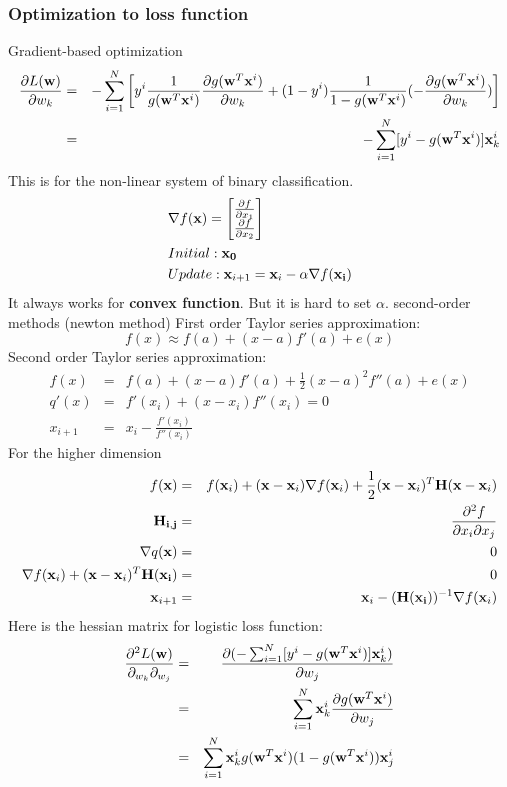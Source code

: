 \documentclass[12pt,a4paper]{article}
\begin{document}
\subsubsection*{Optimization to loss function}
{\large Gradient-based optimization}\\
\begin{eqnarray*}
\frac{\partial L({\bf w})}{\partial w_k} &=& -\sum_{i=1}^{N} \left[y^i\frac{1}{g({\bf w}^T{\bf x}^i)}\frac{\partial g({\bf w}^T{\bf x}^i)}{\partial w_k}+(1-y^i)\frac{1}{1-g({\bf w}^T{\bf x}^i)}(-\frac{\partial g({\bf w}^T{\bf x}^i)}{\partial w_k})\right]\\
&=& -\sum_{i=1}^{N}[y^i-g({\bf w}^T{\bf x}^i)]{\bf x}^i_k 
\end{eqnarray*}
This is for the non-linear system of binary classification.\\
\begin{eqnarray*}
&\nabla f({\bf x}) = \left[\begin{matrix}
\frac{\partial f}{\partial x_1}\\
\frac{\partial f}{\partial x_2}
\end{matrix}\right] \\
&Initial: \bf x_0 \\
&Update: {\bf x}_{i+1} = {\bf x}_i-\alpha\nabla f({\bf x_i}) \\
\end{eqnarray*}
It always works for \textbf{convex function}. But it is hard to set $\alpha$.
\large{second-order methods (newton method)}
First order Taylor series approximation:
$$
f(x) \approx f(a)+(x-a)f'(a)+e(x)
$$
Second order Taylor series approximation:
\begin{eqnarray*}
f(x) &=& f(a)+(x-a)f'(a)+\frac{1}{2}(x-a)^2f''(a)+e(x)\\
q'(x)&=&f'(x_i)+(x-x_i)f''(x_i) = 0\\
x_{i+1}&=&x_i-\frac{f'(x_i)}{f''(x_i)}
\end{eqnarray*}
{\large For the higher dimension}\\
\begin{eqnarray*}
f({\bf x}) &=& f({\bf x}_i)+({\bf x}-{\bf x}_i)\nabla f({\bf x}_i)+\frac{1}{2}({\bf x}-{\bf x}_i)^T{\bf H}({\bf x}-{\bf x}_i)\\
{\bf H_{i,j}} &=& \frac{\partial^2 f}{\partial x_i \partial x_j} \\
\nabla q(\bf x) &=& 0 \\
\nabla f({\bf x}_i)+({\bf x}-{\bf x}_i)^T{\bf H(x_i)} &=& 0 \\
{\bf x}_{i+1} &=& {\bf x}_i-({\bf H(x_i)})^{-1}\nabla f({\bf x}_i)
\end{eqnarray*}
Here is the hessian matrix for logistic loss function:
\begin{eqnarray*}
\frac{\partial^2 L({\bf w})}{\partial_{w_k}\partial_{w_j}} &=& \frac{\partial(-\sum_{i=1}^{N}[y^i-g({\bf w}^T{\bf x}^i)]{\bf x}^i_k )}{\partial w_j}\\
&=& \sum_{i=1}^{N}{\bf x}^i_k\frac{\partial g({\bf w}^T{\bf x}^i)}{\partial w_j}\\
&=& \sum_{i=1}^{N}{\bf x}^i_kg({\bf w}^T{\bf x}^i)(1-g({\bf w}^T{\bf x}^i)){\bf x}^i_j
\end{eqnarray*}
\end{document}
